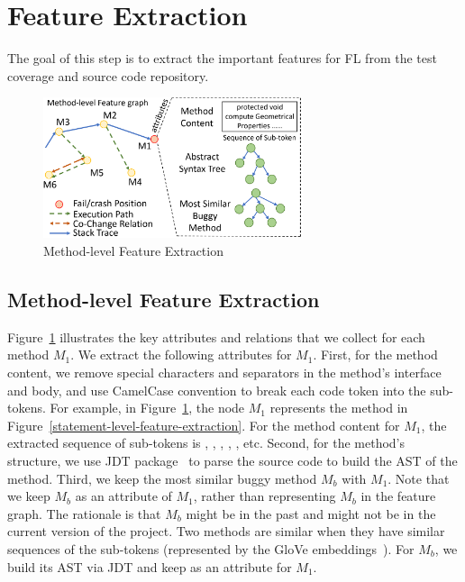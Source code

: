 \section{Feature Extraction}
\label{feature-extract:sec}


The goal of this step is to extract the important features for FL from
the test coverage and source code repository.


\begin{figure}[t]
	\centering
	\includegraphics[width=3in]{graphs/step-1-method.png}
	\caption{Method-level Feature Extraction}
	\label{method-level-feature-extraction}
\end{figure}

\subsection{Method-level Feature Extraction}

Figure~\ref{method-level-feature-extraction} illustrates the key
attributes and relations that we collect for each method $M_1$. We
extract the following attributes for $M_1$. First, for the method
content, we remove special characters and separators in the method's
interface and body, and use CamelCase convention to break each code
token into the sub-tokens. For example, in
Figure~\ref{method-level-feature-extraction}, the node $M_1$
represents the method  in
Figure~\ref{statement-level-feature-extraction}. For the method
content for $M_1$, the extracted sequence of sub-tokens is
, , , ,
, etc. Second, for the method's structure, we use JDT
package~\cite{JDT} to parse the source code to build the AST of the
method. Third, we keep the most similar buggy method $M_b$ with $M_1$.
Note that we keep $M_b$ as an attribute of $M_1$, rather than
representing $M_b$ in the feature graph. The rationale is that $M_b$
might be in the past and might not be in the current version of the
project. Two methods are similar when they have similar sequences of
the sub-tokens (represented by the GloVe embeddings~\cite{glove2014}).
For $M_b$, we build its AST via JDT and keep as an attribute for
$M_1$.


